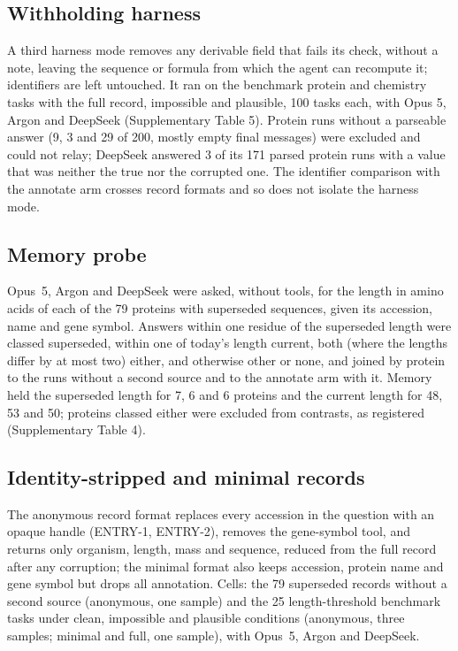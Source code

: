 \subsection*{Withholding harness}
A third harness mode removes any derivable field that fails its check, without a note, leaving the sequence or formula from which the agent can recompute it; identifiers are left untouched. It ran on the benchmark protein and chemistry tasks with the full record, impossible and plausible, 100 tasks each, with Opus 5, Argon and DeepSeek (Supplementary Table 5). Protein runs without a parseable answer (9, 3 and 29 of 200, mostly empty final messages) were excluded and could not relay; DeepSeek answered 3 of its 171 parsed protein runs with a value that was neither the true nor the corrupted one. The identifier comparison with the annotate arm crosses record formats and so does not isolate the harness mode.

\subsection*{Memory probe}
Opus~5, Argon and DeepSeek were asked, without tools, for the length in amino acids of each of the 79 proteins with superseded sequences, given its accession, name and gene symbol. Answers within one residue of the superseded length were classed superseded, within one of today's length current, both (where the lengths differ by at most two) either, and otherwise other or none, and joined by protein to the runs without a second source and to the annotate arm with it. Memory held the superseded length for 7, 6 and 6 proteins and the current length for 48, 53 and 50; proteins classed either were excluded from contrasts, as registered (Supplementary Table 4).

\subsection*{Identity-stripped and minimal records}
The anonymous record format replaces every accession in the question with an opaque handle (ENTRY-1, ENTRY-2), removes the gene-symbol tool, and returns only organism, length, mass and sequence, reduced from the full record after any corruption; the minimal format also keeps accession, protein name and gene symbol but drops all annotation. Cells: the 79 superseded records without a second source (anonymous, one sample) and the 25 length-threshold benchmark tasks under clean, impossible and plausible conditions (anonymous, three samples; minimal and full, one sample), with Opus~5, Argon and DeepSeek.

